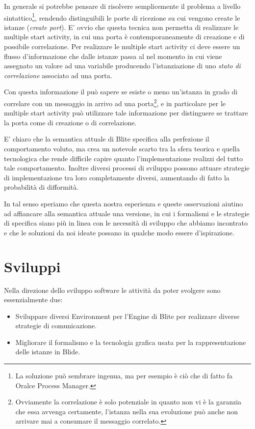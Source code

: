 In generale si potrebbe pensare di risolvere semplicemente il problema a livello
sintattico\footnote{La soluzione può sembrare ingenua, ma per esempio è ciò che
di fatto fa Oralce Process Manager.}, rendendo distinguibili le porte di
ricezione su cui vengono create le istanze (\emph{create port}). E' ovvio che questa tecnica non permetta di realizzare le multiple start
activity, in cui una porta è contemporaneamente di creazione e di possibile
correlazione. Per realizzare le multiple start activity ci deve essere un
flusso d'informazione che dalle istanze passa al  nel
momento in cui viene assegnato un valore ad una variabile producendo
l'istanziazione di uno \emph{stato di correlazione} associato ad una porta.

Con questa informazione il  può sapere se esiste o meno
un'istanza in grado di correlare con un messaggio in arrivo ad una
porta\footnote{Ovviamente la correlazione è solo potenziale in quanto non vi è
la garanzia che essa avvenga certamente, l'istanza nella sua evoluzione può
anche non arrivare mai a consumare il messaggio correlato.}, e in particolare
per le multiple start activity può utilizzare tale informazione per distinguere se trattare la porta come di creazione o di correlazione.

E' chiaro che la semantica attuale di Blite specifica alla perfezione il
comportamento voluto, ma crea un notevole scarto tra la sfera teorica e quella
tecnologica che rende difficile capire quanto l'implementazione realizzi del
tutto tale comportamento. Inoltre diversi processi di sviluppo possono attuare
strategie di implementazione tra loro completamente diversi, aumentando di fatto
la probabilità di difformità.

In tal senso speriamo che questa nostra esperienza e queste osservazioni
aiutino ad affiancare alla semantica attuale una versione, in cui i formalismi e
le strategie di specifica siano più in linea con le necessità di sviluppo che
abbiamo incontrato e che le soluzioni da noi ideate possano in qualche modo
essere d'ispirazione.
  
\section{Sviluppi}

Nella direzione dello sviluppo software le attività da poter svolgere sono
essenzialmente due:

\begin{itemize}
  \item Sviluppare diversi Environment per l'Engine di Blite per realizzare
  diverse strategie di comunicazione.
  \item Migliorare il formalismo e la tecnologia grafica usata per la
  rappresentazione delle istanze in Blide.
\end{itemize} 

